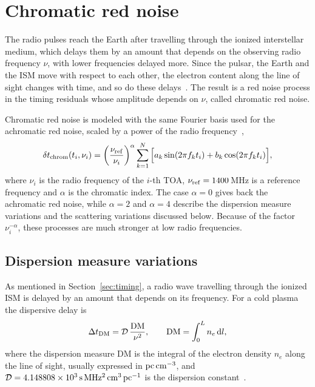 \section{Chromatic red noise} \label{sec:chrom}

The radio pulses reach the Earth after travelling through the ionized
interstellar medium, which delays them by an amount that depends on the
observing radio frequency $\nu$, with lower frequencies delayed more. Since the
pulsar, the Earth and the ISM move with respect to each other, the electron
content along the line of sight changes with time, and so do these delays~\cite{Shaifullah2025}. The
result is a red noise process in the timing residuals whose amplitude depends
on $\nu$, called chromatic red noise.

Chromatic red noise is modeled with the same Fourier basis used for the
achromatic red noise, scaled by a power of the radio
frequency~\cite{Ferranti2025,Iraci2025},
\begin{equation}
    \delta t_{\rm chrom}(t_i, \nu_i) = \left(\frac{\nu_{\rm ref}}{\nu_i}\right)^{\alpha}
    \sum_{k=1}^{N} \Big[ a_k \sin(2\pi f_k t_i) + b_k \cos(2\pi f_k t_i) \Big],
    \label{eq:chrom}
\end{equation}
where $\nu_i$ is the radio frequency of the $i$-th TOA, $\nu_{\rm ref} =
1400$\,MHz is a reference frequency and $\alpha$ is the chromatic index. The
case $\alpha = 0$ gives back the achromatic red noise, while $\alpha = 2$ and
$\alpha = 4$ describe the dispersion measure variations and the scattering
variations discussed below. Because of the factor $\nu_i^{-\alpha}$, these
processes are much stronger at low radio frequencies.

\subsection{Dispersion measure variations} \label{sec:dm}

As mentioned in Section~\ref{sec:timing}, a radio wave travelling through the
ionized ISM is delayed by an amount that depends on its frequency. For a cold
plasma the dispersive delay is
\begin{equation}
    \Delta t_{\rm DM} = \mathcal{D}\,\frac{\rm DM}{\nu^2},
    \qquad
    {\rm DM} = \int_0^L n_e\,\mathrm{d} l,
    \label{eq:DM}
\end{equation}
where the dispersion measure DM is the integral of the electron density $n_e$
along the line of sight, usually expressed in ${\rm pc\,cm^{-3}}$, and
$\mathcal{D} = 4.148808\times10^{3}\,{\rm s\,MHz^2\,cm^3\,pc^{-1}}$ is the
dispersion constant~\cite{Shaifullah2025}.

